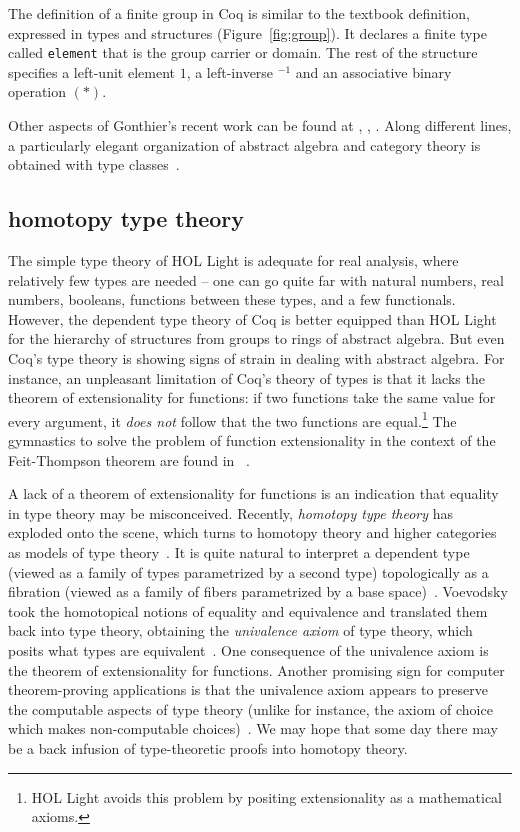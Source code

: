 \documentclass{llncs}
\begin{document}
The definition of a finite group in Coq is similar to the textbook definition,
expressed in types and structures (Figure~\ref{fig:group}).
It declares a finite type called {\tt element} that is the group
carrier or domain.  The rest of the structure specifies a left-unit
element $1$, a left-inverse ${}^{-1}$ and an associative binary
operation $( * )$.  

Other aspects of Gonthier's recent work can be found at
\cite{gonPFSF}, \cite{gonPMS}, \cite{gonC}.
Along different lines, a particularly elegant organization of abstract
algebra and category theory is obtained with type
classes~\cite{SpE11}.

\subsection{homotopy type theory}

The simple type theory of HOL Light is adequate for real analysis,
where relatively few types are needed -- one can go quite far with
natural numbers, real numbers, booleans, functions between these
types, and a few functionals.  However, the dependent type theory of
Coq is better equipped than HOL Light for the hierarchy of structures
from groups to rings of abstract algebra.  But even
Coq's type theory is showing signs of strain in dealing with abstract
algebra.  For instance, an unpleasant limitation of Coq's theory of
types is that it lacks the theorem of extensionality for functions: if
two functions take the same value for every argument, it {\it does
  not} follow that the two functions are equal.\footnote{HOL Light
  avoids this problem by positing extensionality as a mathematical axioms.}  The
gymnastics to solve the problem of function extensionality in the
context of the Feit-Thompson theorem are found in ~\cite{gonMF}.

A lack of a theorem of extensionality for functions is an indication
that equality in type theory may be misconceived. Recently, {\it
  homotopy type theory} has exploded onto the scene, which turns to
homotopy theory and higher categories as models of type
theory~\cite{htt}.  It is quite natural to interpret a dependent type
(viewed as a family of types parametrized by a second type)
topologically as a fibration (viewed as a family of fibers
parametrized by a base space)~\cite{AW09}. Voevodsky took the
homotopical notions of equality and equivalence and translated them
back into type theory, obtaining the {\it univalence axiom} of type
theory, which posits what types are equivalent~\cite{VV11}.  One
consequence of the univalence axiom is the theorem of extensionality
for functions.  Another promising sign for computer theorem-proving
applications is that the univalence axiom appears to preserve the
computable aspects of type theory (unlike for instance, the axiom of
choice which makes non-computable choices)~\cite{LH11}.  We may hope
that some day there may be a back infusion of type-theoretic proofs
into homotopy theory.
\end{document}
